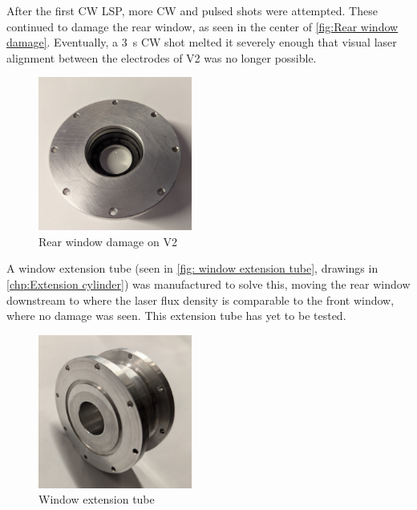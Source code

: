 After the first CW LSP, more CW and pulsed shots were attempted. These continued to damage the rear window, as seen in the center of \autoref{fig:Rear window damage}. Eventually, a \qty{3}{s} CW shot melted it severely enough that visual laser alignment between the electrodes of V2 was no longer possible.
\begin{figure}[!ht]
    \centering
    \includegraphics[width=0.45\textwidth]{assets/4 experiments/window damage.jpg}
    \caption{Rear window damage on V2}
    \label{fig:Rear window damage}
\end{figure}
A window extension tube (seen in \autoref{fig: window extension tube}, drawings in \autoref{chp:Extension cylinder}) was manufactured to solve this, moving the rear window downstream to where the laser flux density is comparable to the front window, where no damage was seen. This extension tube has yet to be tested.
\begin{figure}[!ht]
    \centering
    \includegraphics[width=0.45\textwidth]{assets/5 discussion/Extension cylinder.jpg}
    \caption{Window extension tube}
    \label{fig: window extension tube}
\end{figure}

